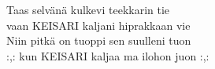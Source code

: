 
Taas selvänä kulkevi teekkarin tie \\ vaan KEISARI kaljani hiprakkaan vie \\ Niin pitkä on tuoppi sen suulleni tuon \\ :,: kun KEISARI kaljaa ma ilohon juon :,: